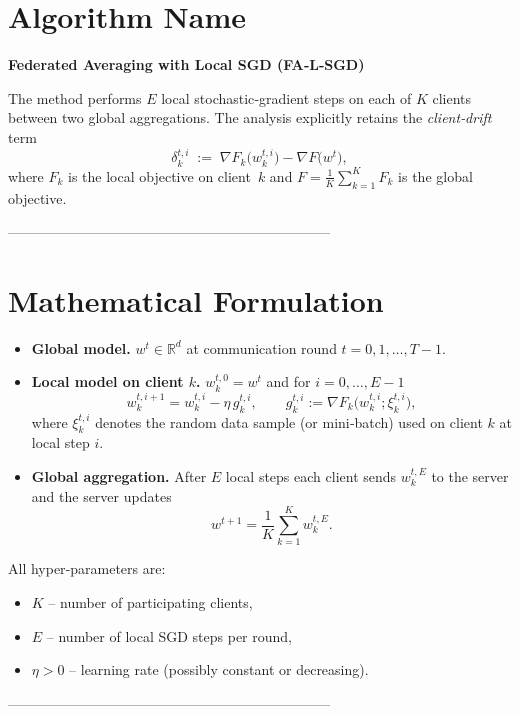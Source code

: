 \documentclass{article}
\newcommand{\RR}{\mathbb{R}}
\begin{document}
\section*{Algorithm Name}
\textbf{Federated Averaging with Local SGD (FA‑L‑SGD)}  

The method performs $E$ local stochastic‑gradient steps on each of $K$ clients
between two global aggregations.  The analysis explicitly retains the
\emph{client‑drift} term 
\[
\delta_{k}^{t,i}\;:=\;\nabla F_k\!\bigl(w_{k}^{t,i}\bigr)-\nabla F\!\bigl(w^{t}\bigr),
\]
where $F_k$ is the local objective on client~$k$ and $F=\frac1K\sum_{k=1}^K F_k$ is the global objective.

---------------------------------------------------------------------

\section*{Mathematical Formulation}
\begin{itemize}[leftmargin=*]
  \item \textbf{Global model.} $w^{t}\in\RR^{d}$ at communication round $t=0,1,\dots,T-1$.
  \item \textbf{Local model on client $k$.} $w_{k}^{t,0}=w^{t}$ and for $i=0,\dots,E-1$
  \[
      w_{k}^{t,i+1}=w_{k}^{t,i}-\eta\,g_{k}^{t,i},
      \qquad
      g_{k}^{t,i}:=\nabla F_k\!\bigl(w_{k}^{t,i};\xi_{k}^{t,i}\bigr),
  \]
  where $\xi_{k}^{t,i}$ denotes the random data sample (or mini‑batch) used on
  client $k$ at local step $i$.
  \item \textbf{Global aggregation.}
  After $E$ local steps each client sends $w_{k}^{t,E}$ to the server and the
  server updates
  \[
      w^{t+1}= \frac1K\sum_{k=1}^{K} w_{k}^{t,E}.
  \]
\end{itemize}
All hyper‑parameters are:
\begin{itemize}[leftmargin=*]
  \item $K$ – number of participating clients,
  \item $E$ – number of local SGD steps per round,
  \item $\eta>0$ – learning rate (possibly constant or decreasing).
\end{itemize}

---------------------------------------------------------------------
\end{document}
